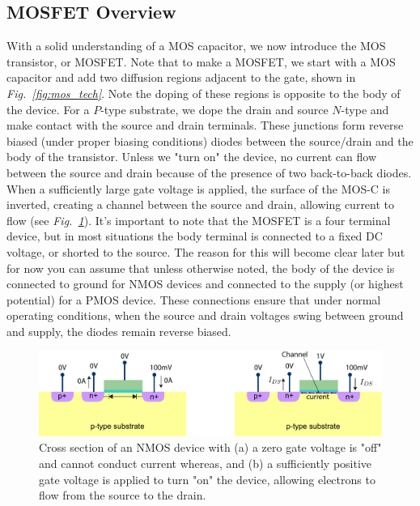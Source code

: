 \subsection{MOSFET Overview}
With a solid understanding of a MOS capacitor, we now introduce the MOS transistor, or MOSFET.  Note that to make a MOSFET, we start with a MOS capacitor and add two diffusion regions adjacent to the gate, shown in \emph{Fig.~\ref{fig:mos_tech}}.  Note the doping of these regions is opposite to the body of the device.  For a $P$-type substrate, we dope the drain and source $N$-type and make contact with the source and drain terminals.  These junctions form reverse biased (under proper biasing conditions) diodes between the source/drain and the body of the transistor.  Unless we "turn on" the device, no current can flow between the source and drain because of the presence of two back-to-back diodes.  When a sufficiently large gate voltage is applied, the surface of the MOS-C is inverted, creating a channel between the source and drain, allowing current to flow (see \emph{Fig.~\ref{fig:mos_current}}).    
It's important to note that the MOSFET is a four terminal device, but in most situations the body terminal is connected to a fixed DC voltage, or shorted to the source.  The reason for this will become clear later but for now you can assume that unless otherwise noted, the body of the device is connected to ground for NMOS devices and connected to the supply (or highest potential) for a PMOS device.  These connections ensure that under normal operating conditions, when the source and drain voltages swing between ground and supply, the diodes remain reverse biased.
\begin{figure}[tb]
\centering
\includegraphics[width=\columnwidth]{mostfetxsect_current} 
\caption{Cross section of an NMOS device with (a) a zero gate voltage is "off" and cannot conduct current whereas, and (b) a sufficiently positive gate voltage is applied to turn "on" the device, allowing electrons to flow from the source to the drain.}
\label{fig:mos_current}
\end{figure}
